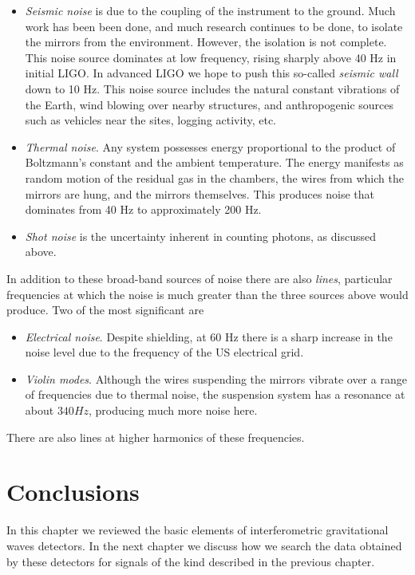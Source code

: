 \begin{itemize} 

\item \emph{Seismic noise} is due to the coupling of the
instrument to the ground.  Much work has been been done, and much
research continues to be done, to isolate the mirrors from the
environment.  However, the isolation is not complete.  This noise
source dominates at low frequency, rising sharply above 40 Hz in
initial LIGO.  In advanced LIGO we hope to push this so-called
\emph{seismic wall} down to 10 Hz.  This noise source includes the
natural constant vibrations of the Earth, wind blowing over nearby
structures, and anthropogenic sources such as vehicles near the sites,
logging activity, etc.

\item \emph{Thermal noise}. Any system possesses energy proportional to 
the product of Boltzmann's constant and the ambient temperature.  The
energy manifests as random motion of the residual gas in the chambers,
the wires from which the mirrors are hung, and the mirrors themselves.
This produces noise that dominates from 40 Hz to approximately 200 Hz.

\item \emph{Shot noise} is the uncertainty inherent in counting
photons, as discussed above.

\end{itemize}

In addition to these broad-band sources of noise there are also
\emph{lines}, particular frequencies at which the noise is much
greater than the three sources above would produce.  Two of the most
significant are

\begin{itemize}
\item \emph{Electrical noise}.  Despite shielding, at 60 Hz there is a
sharp increase in the noise level due to the frequency of the US
electrical grid.
\item \emph{Violin modes}.  Although the wires suspending the mirrors
vibrate over a range of frequencies due to thermal noise, the
suspension system has a resonance at about $340 Hz$, producing much
more noise here.
\end{itemize}

There are also lines at higher harmonics of these frequencies.


\section{Conclusions}

In this chapter we reviewed the basic elements of interferometric
gravitational waves detectors.  In the next chapter we discuss how we
search the data obtained by these detectors for signals of the kind
described in the previous chapter.

